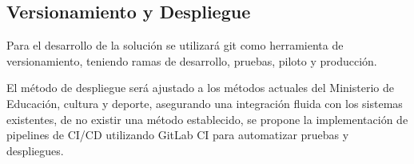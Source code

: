 \subsection{Versionamiento y Despliegue}

Para el desarrollo de la solución se utilizará git como herramienta de versionamiento, teniendo ramas de desarrollo, pruebas, piloto y producción.

El método de despliegue será ajustado a los métodos actuales del Ministerio de Educación, cultura y deporte, asegurando una integración fluida con los sistemas existentes, de no existir una método establecido, se propone la implementación de pipelines de CI/CD utilizando GitLab CI para automatizar pruebas y despliegues.